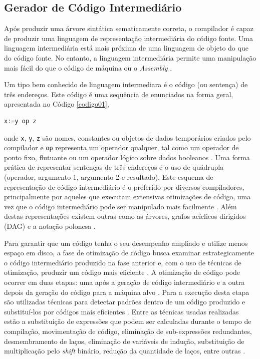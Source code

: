 \subsection{Gerador de Código Intermediário}

Após produzir uma árvore sintática sematicamente correta, o compilador é capaz de
 produzir uma linguagem de representação intermediária do código fonte. Uma linguagem 
intermediária está mais próxima de uma linguagem de objeto do que do código fonte. 
No entanto, a linguagem  intermediária permite uma manipulação mais fácil do que o 
código de máquina ou o \textit{Assembly} \cite[pag.8]{ref25}. 

Um tipo bem conhecido de linguagem intermediara é o código (ou sentença) de três 
endereços\cite[pag.247]{ref26}. Este código é uma sequência de enunciados na forma geral, apresentada 
 no Código \ref{codigo01},

\begin{lstlisting}[language=C++,caption={Código de três endereços},
											label=codigo01]
   x:=y op z
\end{lstlisting}
onde \texttt{x}, \texttt{y}, \texttt{z} são nomes, constantes ou objetos de dados 
temporários criados pelo compilador e \texttt{op} representa um operador qualquer,
 tal como um operador de ponto fixo, flutuante ou um operador lógico sobre dados
 booleanos \cite[pag.201]{ref6}. Uma forma prática de representar sentenças de três endereços é o uso
 de quádrupla (operador, argumento 1, argumento 2 e resultado). 
Este esquema de representação de código intermediário é o preferido por diversos
 compiladores, principalmente por aqueles que executam extensivas otimizações de
 código, uma vez que o código intermediário pode ser manipulado mais 
facilmente \cite[pag.604]{ref5}. Além destas representações existem outras como as 
árvores, grafos acíclicos dirigidos (DAG) e a notação polonesa \cite[pag.96]{ref29}.

Para garantir que um código tenha o seu desempenho ampliado e utilize menos 
espaço em disco, a fase de otimização de código busca examinar 
estrategicamente o código intermediário produzido na fase anterior e, com o 
uso de técnicas de otimização, produzir um código mais eficiente \cite[pag.796]{ref30}
. A otimização de código pode ocorrer em duas etapas: uma após a geração de 
código intermediário e a outra depois da geração do código para a máquina 
alvo \cite[pag.34]{ref6}. 
Para a execução desta etapa são utilizadas técnicas para detectar 
padrões dentro de um código produzido e substituí-los por códigos mais
 eficientes \cite[pag.604]{ref5}. Entre as técnicas usadas realizadas estão a 
substituição de expressões que podem ser calculadas durante o tempo 
de compilação, movimentação de código, eliminação de sub-expressões 
redundantes, desmembramento de laços, eliminação de variáveis de indução, 
substituição de multiplicação pelo \textit{shift} binário, redução da 
quantidade de laços, entre outras \cite[pag.796]{ref30}.

